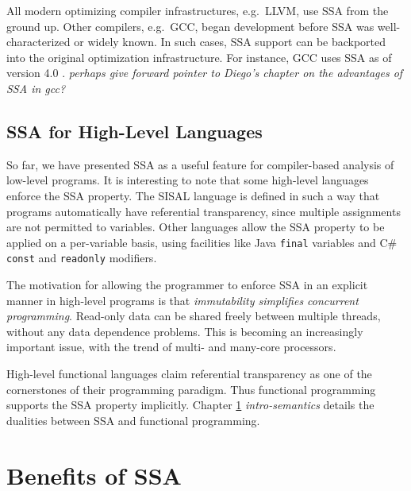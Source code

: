 All modern optimizing compiler infrastructures, e.g.\ LLVM, 
use SSA from the ground up.
Other compilers, e.g.\ GCC, began
development before SSA was well-characterized or
widely known.
In such cases, SSA support can be backported into 
the original optimization infrastructure.
For instance, GCC uses SSA as of version 4.0
\cite{novillo03tree,novillo04design}.
\textit{perhaps give forward pointer to Diego's chapter on the advantages
of SSA in gcc?}

\subsection{SSA for High-Level Languages}

So far, we have presented SSA as a useful feature for 
compiler-based analysis of low-level programs.
It is interesting to note that some high-level languages enforce
the SSA property.
The SISAL language is defined in such a way that
programs automatically have referential transparency, since
multiple assignments are not permitted to variables.
Other languages allow the SSA property to be
applied on a per-variable basis, using facilities like
Java \texttt{final} variables
and C\# \texttt{const} and \texttt{readonly} modifiers. 

The motivation for allowing the programmer to enforce
SSA in an explicit manner in high-level programs is that
\textit{immutability simplifies concurrent programming}.
Read-only data can be shared freely between multiple threads,
without any data dependence problems.
This is becoming an increasingly important issue, with the
trend of multi- and many-core processors.

High-level functional languages claim
referential transparency as one of the
cornerstones of their programming paradigm.
Thus functional programming supports the SSA property
implicitly.
Chapter \ref{} \textit{intro-semantics} details the 
dualities between SSA and functional programming.





\section{Benefits of SSA}

